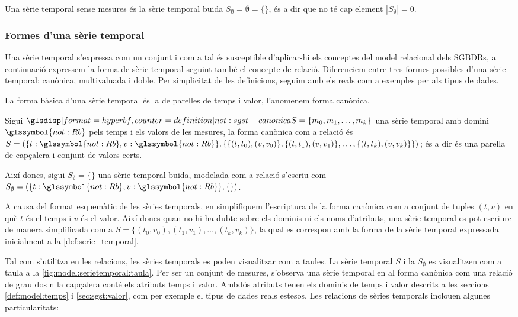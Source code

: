 Una sèrie temporal sense mesures és la sèrie temporal buida
$S_\emptyset= \emptyset = \{\}$, és a dir que no té cap element
$|S_\emptyset|=0$.

 


\subsubsection{Formes d'una sèrie temporal}


Una sèrie temporal s'expressa com un conjunt i com a tal és
susceptible d'aplicar-hi els conceptes del model relacional dels
\glspl{SGBDR}, a continuació
expressem la forma de sèrie temporal seguint també el concepte de
relació. Diferenciem entre tres formes possibles d'una sèrie temporal:
canònica, multivaluada i doble.  Per simplicitat de les definicions,
seguim amb els reals com a exemples per als tipus de dades.


La forma bàsica d'una sèrie temporal és la de parelles de temps i
valor, l'anomenem forma canònica. 
\begin{definition}
  \label{def:sgst:forma-canonica}
  Sigui $\glsdispdef{not:sgst-canonica}{S = \{ m_0, m_1 , \dotsc, m_k
    \}}$ una sèrie temporal amb domini $\glssymbol{not:Rb}$ pels temps
  i els valors de les mesures, la forma canònica com a relació és $S =
  ( \{t: \glssymbol{not:Rb}, v: \glssymbol{not:Rb}\}, \{ \{
  (t,t_0),(v,v_0)\}, \{(t,t_1),(v,v_1)\}, \dotsc, \{(t,t_k),(v,v_k)\}
  \} )$; és a dir és una parella de capçalera i conjunt de valors
  certs.

  Així doncs, sigui $S_{\emptyset} = \{ \}$ una sèrie temporal buida,
  modelada com a relació s'escriu com $S_{\emptyset} = ( \{t:
  \glssymbol{not:Rb}, v: \glssymbol{not:Rb}\}, \{ \} )$.
\end{definition}


A causa del format esquemàtic de les sèries temporals, en simplifiquem
l'escriptura de la forma canònica com a conjunt de tuples $(t,v)$ en
què $t$ és el temps i $v$ és el valor. Així doncs quan no hi ha dubte
sobre els dominis ni els noms d'atributs, una sèrie temporal es pot
escriure de manera simplificada com a $S = \{ (t_0,v_0), (t_1,v_1),
\dotsc, (t_k,v_k) \}$, la qual es correspon amb la forma de la sèrie
temporal expressada inicialment a la \autoref{def:serie_temporal}.


Tal com s'utilitza en les relacions, les sèries temporals es poden
visualitzar com a taules. La sèrie temporal $S$ i la $S_{\emptyset}$
es visualitzen com a taula a la
\autoref{fig:model:serietemporal:taula}.
Per ser un conjunt de mesures, s'observa una sèrie temporal en al
forma canònica com una relació de grau dos n la capçalera conté els
atributs temps i valor. Ambdós atributs tenen els dominis de temps i
valor descrits a les seccions \ref{def:model:temps} i
\ref{sec:sgst:valor}, com per exemple el tipus de dades reals
estesos. Les relacions de sèries temporals inclouen algunes
particularitats:


